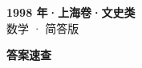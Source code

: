 \documentclass[zihao=-4, a4paper]{ctexart}
\begin{document}
\begin{center}
  {\Large\bfseries 1998 年·上海卷·文史类}\\[4pt]
  {\large 数学 · 简答版}
\end{center}
\medskip
{}

\clearpage
{}
\begin{center}{\Large\bfseries 答案速查}\end{center}
\medskip

\end{document}
